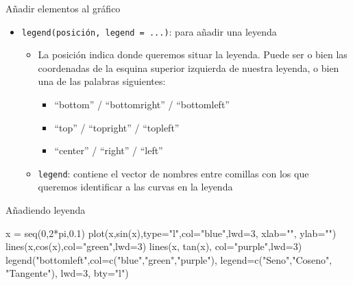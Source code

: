 \documentclass[
  ignorenonframetext,
  aspectratio=169]{beamer}
\newenvironment{Shaded}{\begin{snugshade}}{\end{snugshade}}
\newcommand{\AttributeTok}[1]{\textcolor[rgb]{0.77,0.63,0.00}{#1}}
\newcommand{\DecValTok}[1]{\textcolor[rgb]{0.00,0.00,0.81}{#1}}
\newcommand{\FloatTok}[1]{\textcolor[rgb]{0.00,0.00,0.81}{#1}}
\newcommand{\FunctionTok}[1]{\textcolor[rgb]{0.00,0.00,0.00}{#1}}
\newcommand{\NormalTok}[1]{#1}
\newcommand{\OtherTok}[1]{\textcolor[rgb]{0.56,0.35,0.01}{#1}}
\newcommand{\SpecialCharTok}[1]{\textcolor[rgb]{0.00,0.00,0.00}{#1}}
\newcommand{\StringTok}[1]{\textcolor[rgb]{0.31,0.60,0.02}{#1}}
\providecommand{\tightlist}{%
  \setlength{\itemsep}{0pt}\setlength{\parskip}{0pt}}
\begin{document}
\begin{frame}[fragile]{Añadir elementos al gráfico}
\protect\hypertarget{auxf1adir-elementos-al-gruxe1fico-3}{}
\begin{itemize}
\tightlist
\item
  \texttt{legend(posición,\ legend\ =\ ...)}: para añadir una leyenda

  \begin{itemize}
  \tightlist
  \item
    La posición indica donde queremos situar la leyenda. Puede ser o
    bien las coordenadas de la esquina superior izquierda de nuestra
    leyenda, o bien una de las palabras siguientes:

    \begin{itemize}
    \tightlist
    \item
      ``bottom'' / ``bottomright'' / ``bottomleft''
    \item
      ``top'' / ``topright'' / ``topleft''
    \item
      ``center'' / ``right'' / ``left''
    \end{itemize}
  \item
    \texttt{legend}: contiene el vector de nombres entre comillas con
    los que queremos identificar a las curvas en la leyenda
  \end{itemize}
\end{itemize}
\end{frame}

\begin{frame}[fragile]{Añadiendo leyenda}
\protect\hypertarget{auxf1adiendo-leyenda}{}
\begin{Shaded}
\begin{Highlighting}[]
\NormalTok{x }\OtherTok{=} \FunctionTok{seq}\NormalTok{(}\DecValTok{0}\NormalTok{,}\DecValTok{2}\SpecialCharTok{*}\NormalTok{pi,}\FloatTok{0.1}\NormalTok{)}
\FunctionTok{plot}\NormalTok{(x,}\FunctionTok{sin}\NormalTok{(x),}\AttributeTok{type=}\StringTok{"l"}\NormalTok{,}\AttributeTok{col=}\StringTok{"blue"}\NormalTok{,}\AttributeTok{lwd=}\DecValTok{3}\NormalTok{, }\AttributeTok{xlab=}\StringTok{""}\NormalTok{, }\AttributeTok{ylab=}\StringTok{""}\NormalTok{)}
\FunctionTok{lines}\NormalTok{(x,}\FunctionTok{cos}\NormalTok{(x),}\AttributeTok{col=}\StringTok{"green"}\NormalTok{,}\AttributeTok{lwd=}\DecValTok{3}\NormalTok{)}
\FunctionTok{lines}\NormalTok{(x, }\FunctionTok{tan}\NormalTok{(x), }\AttributeTok{col=}\StringTok{"purple"}\NormalTok{,}\AttributeTok{lwd=}\DecValTok{3}\NormalTok{)}
\FunctionTok{legend}\NormalTok{(}\StringTok{"bottomleft"}\NormalTok{,}\AttributeTok{col=}\FunctionTok{c}\NormalTok{(}\StringTok{"blue"}\NormalTok{,}\StringTok{"green"}\NormalTok{,}\StringTok{"purple"}\NormalTok{), }
       \AttributeTok{legend=}\FunctionTok{c}\NormalTok{(}\StringTok{"Seno"}\NormalTok{,}\StringTok{"Coseno"}\NormalTok{, }\StringTok{"Tangente"}\NormalTok{), }
       \AttributeTok{lwd=}\DecValTok{3}\NormalTok{, }\AttributeTok{bty=}\StringTok{"l"}\NormalTok{)}
\end{Highlighting}
\end{Shaded}
\end{frame}
\end{document}
